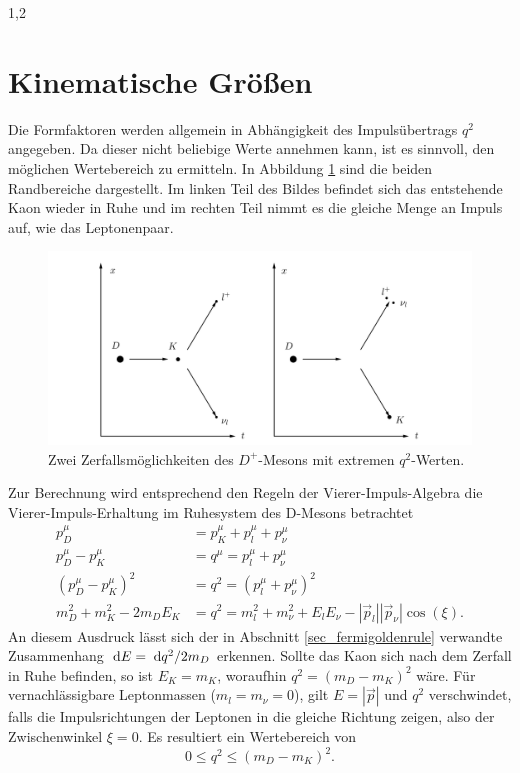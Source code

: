 \documentclass[11pt,a4paper,twoside]{report}
\begin{document}
\begin{spacing}{1,2}
\section{Kinematische Größen}
Die Formfaktoren werden allgemein in Abhängigkeit des Impulsübertrags $q^2$ angegeben. Da dieser nicht beliebige Werte annehmen kann, ist es sinnvoll, den 
möglichen Wertebereich zu ermitteln.  In Abbildung \ref{pic_DZerfall} sind die beiden Randbereiche dargestellt. Im linken Teil des Bildes befindet sich das 
entstehende Kaon wieder in Ruhe und im rechten Teil nimmt es die gleiche Menge an Impuls auf, wie das Leptonenpaar.
\begin{figure}[H]
\includegraphics[width=1\textwidth]{Abbildungen/DZerfall.png}
\caption{Zwei Zerfallsmöglichkeiten des $D^+$-Mesons  mit extremen $q^2$-Werten.}
\label{pic_DZerfall}
\end{figure}
\noindent
Zur Berechnung wird entsprechend den Regeln der Vierer-Impuls-Algebra die Vierer-Impuls-Erhaltung im Ruhesystem des D-Mesons betrachtet
\begin{align}
 p_D^\mu &= p_K^\mu + p_l^\mu + p_\nu^\mu \nonumber\\
 p_D^\mu - p_K^\mu &= q^\mu = p_l^\mu + p_\nu^\mu \nonumber\\
 \left(p_D^\mu-p_K^\mu\right)^2 &= q^2 =  (p_l^\mu + p_\nu^\mu )^2\nonumber\\
 m_D^2 + m_K^2 - 2m_DE_K &= q^2 = m_l^2 + m_\nu^2 + E_lE_\nu - |\vec p_l||\vec p_\nu|\cos(\xi).
\end{align}
An diesem Ausdruck lässt sich der in Abschnitt \ref{sec_fermigoldenrule} verwandte Zusammenhang $\; \mathrm{d} E = \; \mathrm{d} q^2/2m_D$ erkennen.
Sollte das Kaon sich nach dem Zerfall in Ruhe befinden, so ist $E_K = m_K$, woraufhin $q^2 = (m_D-m_K)^2$ wäre. Für vernachlässigbare Leptonmassen 
($m_l=m_\nu=0$), gilt $E=|\vec p|$ und $q^2$ verschwindet, falls die Impulsrichtungen der Leptonen in die gleiche Richtung zeigen, also der Zwischenwinkel
$\xi = 0$. Es resultiert ein Wertebereich von
\begin{equation}
 0 \leq q^2 \leq (m_D - m_K)^2.
\end{equation}


\end{spacing}
\end{document}
